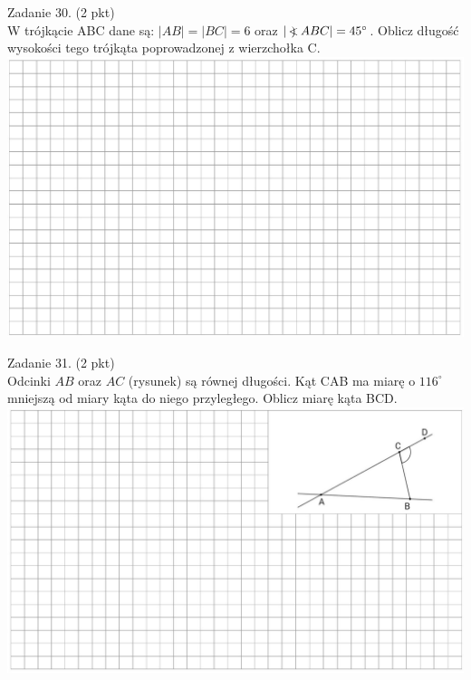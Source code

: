 \documentclass[10pt]{article}
\newcommand\Varangle{\mathop{{<\!\!\!\!\!\text{\small)}}\:}\nolimits}
\begin{document}
Zadanie 30. (2 pkt)\\
W trójkącie ABC dane są: \(|A B|=|B C|=6\) oraz \(|\Varangle A B C|=45^{\circ}\). Oblicz długość wysokości tego trójkąta poprowadzonej z wierzchołka C.\\
\includegraphics[max width=\textwidth, center]{2024_11_21_55bf50695fa934dbe20eg-10(1)}

Zadanie 31. (2 pkt)\\
Odcinki \(A B\) oraz \(A C\) (rysunek) są równej długości. Kąt CAB ma miarę o \(116^{\circ}\) mniejszą od miary kąta do niego przyległego. Oblicz miarę kąta BCD.\\
\includegraphics[max width=\textwidth, center]{2024_11_21_55bf50695fa934dbe20eg-10}
\end{document}
